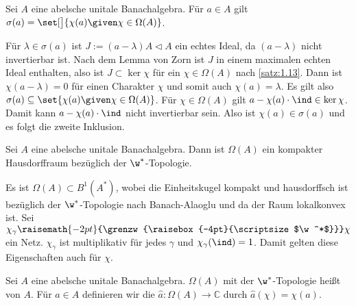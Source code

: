 \begin{satz}[label=satz:1.14,{name=[Spektrum entspricht Menge der $\chi(a)$]}]
	Sei $A$ eine abelsche unitale Banachalgebra. Für $a \in A$ gilt $\sigma(a)=\set[\big]{\chi(a) \given \chi \in \Omega(A)}$.
\end{satz}
\begin{beweis}
	Für $\lambda \in \sigma(a)$ ist $J := (a -\lambda)A \lhd A$ ein echtes Ideal, da $(a-\lambda)$ nicht invertierbar ist. 
	Nach dem Lemma von Zorn ist $J$ in einem maximalen echten Ideal enthalten, also ist $J \subset \ker \chi$ für ein $\chi \in \Omega(A)$ nach \autoref{satz:1.13}. 
	Dann ist $\chi(a- \lambda)=0$ für einen Charakter $\chi$ und somit auch $\chi(a)=\lambda$. 
	Es gilt also $\sigma(a) \subseteq \set{\chi(a) \given \chi \in \Omega(A)}$.	
	Für $\chi \in \Omega(A)$ gilt $a- \chi(a) \cdot \ind \in \ker \chi$. Damit kann $a- \chi(a) \cdot \ind$ nicht invertierbar sein. Also ist $\chi(a) \in \sigma(a)$ und es folgt 
	die zweite Inklusion.
\end{beweis}

\begin{satz}[label=satz:1.15,{name=[Charakterspektrum ist kompakt]}]
	Sei $A$ eine abelsche unitale Banachalgebra. Dann ist $\Omega(A)$ ein kompakter Hausdorffraum bezüglich der $\w^*$-Topologie.
\end{satz}
\begin{beweis}
	Es ist $\Omega(A) \subset B^1(A^*)$, wobei die Einheitskugel kompakt und hausdorffsch ist bezüglich der $\w^*$-Topologie nach Banach-Alaoglu und da der Raum lokalkonvex 
	ist. Sei $\chi_\gamma \raisemath{-2pt}{\grenzw{\raisebox{-4pt}{\scriptsize$\w^*$}}}\chi$ ein Netz. $\chi_\gamma$ ist multiplikativ für jedes $\gamma$ und $\chi_\gamma(\ind)=1$. Damit gelten diese Eigenschaften auch für 
	$\chi$.
\end{beweis}

\begin{definition}[{name=[Charakterspektrum und Gelfandtransformation]}]
	Sei $A$ eine abelsche unitale Banachalgebra. $\Omega(A)$ mit der $\w^*$-Topologie heißt  von $A$. Für $a \in A$ definieren wir
	die  $\widehat{a} \colon \Omega(A) \to \mathbb{C}$ durch $\widehat{a}(\chi)=\chi(a)$. 
\end{definition}

